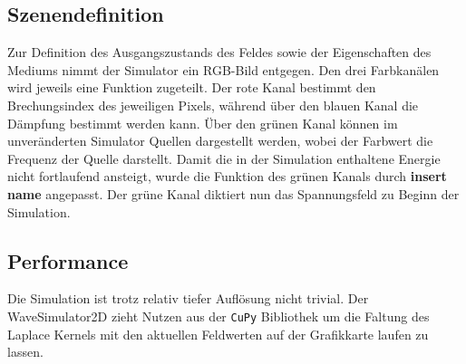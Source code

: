 \subsection{Szenendefinition}
Zur Definition des Ausgangszustands des Feldes sowie der Eigenschaften des Mediums nimmt der Simulator ein RGB-Bild entgegen.
Den drei Farbkanälen wird jeweils eine Funktion zugeteilt.
Der rote Kanal bestimmt den Brechungsindex des jeweiligen Pixels, während über den blauen Kanal die Dämpfung bestimmt werden kann.
Über den grünen Kanal können im unveränderten Simulator Quellen dargestellt werden, wobei der Farbwert die Frequenz der Quelle darstellt.
Damit die in der Simulation enthaltene Energie nicht fortlaufend ansteigt, wurde die Funktion des grünen Kanals durch \textbf{insert name} angepasst. %
Der grüne Kanal diktiert nun das Spannungsfeld zu Beginn der Simulation. %

\subsection{Performance} %
Die Simulation ist trotz relativ tiefer Auflösung nicht trivial. 
Der WaveSimulator2D zieht Nutzen aus der \texttt{CuPy} Bibliothek um die Faltung des Laplace Kernels mit den aktuellen Feldwerten auf der Grafikkarte laufen zu lassen.
